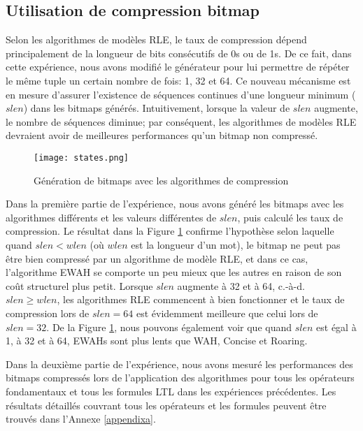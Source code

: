 
\subsection{Utilisation de compression bitmap} %

Selon les algorithmes de modèles RLE, le taux de compression dépend principalement de la longueur de bits consécutifs de 0s ou de 1s. De ce fait, dans cette expérience, nous avons modifié le générateur pour lui permettre de répéter le même tuple un certain nombre de fois: 1, 32 et 64. Ce nouveau mécanisme est en mesure d'assurer l'existence de séquences continues d'une longueur minimum ($slen$) dans les bitmaps générés. Intuitivement, lorsque la valeur de $slen$ augmente, le nombre de séquences diminue; par conséquent, les algorithmes de modèles RLE devraient avoir de meilleures performances qu'un bitmap non compressé.

\begin{figure}[h]
\begin{center}
\centering
\texttt{[image: states.png]}
\caption{Génération de bitmaps avec les algorithmes de compression}
\label{img:states}
\end{center}
\end{figure}

Dans la première partie de l'expérience, nous avons généré les bitmaps avec les algorithmes différents et les valeurs différentes de $slen$, puis calculé les taux de compression. Le résultat dans la Figure \ref{img:states} confirme l'hypothèse selon laquelle quand $slen < wlen$ (où $wlen$ est la longueur d'un mot), le bitmap ne peut pas être bien compressé par un algorithme de modèle RLE, et dans ce cas, l'algorithme EWAH se comporte un peu mieux que les autres en raison de son coût structurel plus petit. Lorsque $slen$ augmente à 32 et à 64, c.-à-d. $slen \geq wlen$, les algorithmes RLE commencent à bien fonctionner et le taux de compression lors de $slen = 64$ est évidemment meilleure que celui lors de $slen = 32$. De la Figure \ref{img:states}, nous pouvons également voir que quand $slen$ est égal à 1, à 32 et à 64, EWAHs sont plus lents que WAH, Concise et Roaring.

Dans la deuxième partie de l'expérience, nous avons mesuré les performances des bitmaps compressés lors de l'application des algorithmes pour tous les opérateurs fondamentaux et tous les formules LTL dans les expériences précédentes. Les résultats détaillés couvrant tous les opérateurs et les formules peuvent être trouvés dans l'Annexe \ref{appendixa}.

